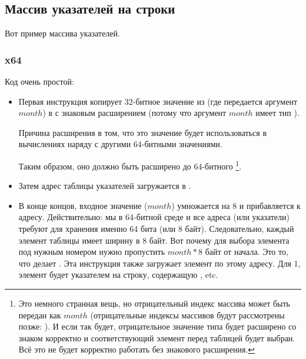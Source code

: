 ﻿\subsection{Массив указателей на строки}
\label{array_of_pointers_to_strings}

Вот пример массива указателей.



\subsubsection{x64}



Код очень простой:

\begin{itemize}

\item
{}
Первая инструкция  копирует 32-битное значение из \ECX (где передается аргумент $month$)
в \RAX с знаковым расширением (потому что аргумент $month$ имеет тип \Tint).

Причина расширения в том, что это значение будет использоваться в вычислениях наряду с другими 64-битными
значениями.

Таким образом, оно должно быть расширено до 64-битного
\footnote{Это немного странная вещь, но отрицательный индекс массива может быть передан как $month$ 
(отрицательные индексы массивов будут рассмотрены позже: ).
И если так будет, отрицательное значение типа \Tint будет расширено со знаком корректно
и соответствующий элемент перед таблицей будет выбран.
Всё это не будет корректно работать без знакового расширения.}.

\item
Затем адрес таблицы указателей загружается в \RCX.

\item
В конце концов, входное значение ($month$) умножается на 8 и прибавляется к адресу.
Действительно: мы в 64-битной среде и все адреса (или указатели) 
требуют для хранения именно 64 бита (или 8 байт).
Следовательно, каждый элемент таблицы имеет ширину в 8 байт.
Вот почему для выбора элемента под нужным номером нужно пропустить $month*8$ байт от начала.
Это то, что делает \MOV.
Эта инструкция также загружает элемент по этому адресу.
Для 1, элемент будет указателем на строку, содержащую , etc.

\end{itemize}

